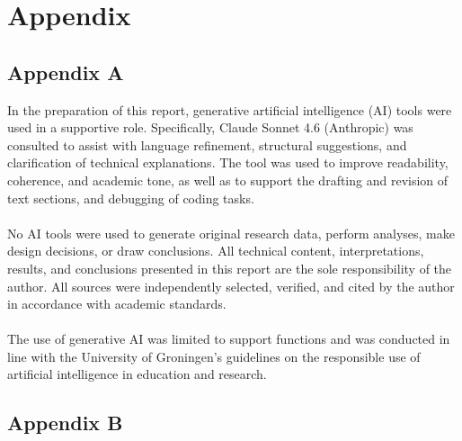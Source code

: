 \section*{Appendix}
\subsection*{Appendix A}

In the preparation of this report, generative artificial intelligence (AI) tools were used in a
supportive role. Specifically, Claude Sonnet 4.6 (Anthropic) was consulted to assist with language
refinement, structural suggestions, and clarification of technical explanations. The tool was used to improve readability, coherence, and academic tone, as well as to support the
drafting and revision of text sections, and debugging of coding tasks.\\\\
No AI tools were used to generate original research data, perform analyses, make design
decisions, or draw conclusions. All technical content, interpretations, results, and conclusions presented in this report are the sole responsibility of the author. All sources were independently selected, verified, and cited by the author in accordance with
academic standards.\\\\
The use of generative AI was limited to support functions and was conducted in line with
the University of Groningen’s guidelines on the responsible use of artificial intelligence in
education and research.
\subsection*{Appendix B}


